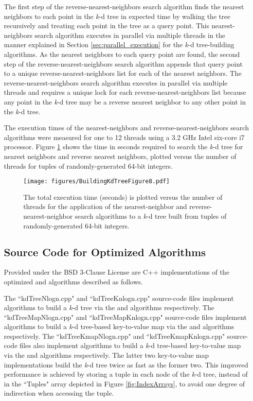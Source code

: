 \documentclass{sig-alternate}
\begin{document}
The first step of the reverse-nearest-neighbors search algorithm finds the  nearest neighbors to each point in the \emph{k}-d tree in  expected time by walking the tree recursively and treating each point in the tree as a query point. This nearest-neighbors search algorithm executes in parallel via multiple threads in the manner explained in Section \ref{sec:parallel_execution} for the \emph{k}-d tree-building algorithms. As the  nearest neighbors to each query point are found, the second step of the reverse-nearest-neighbors search algorithm appends that query point to a unique reverse-nearest-neighbors list for each of the  nearest neighbors. The reverse-nearest-neighbors search algorithm executes in parallel via multiple threads and requires a unique lock for each reverse-nearest-neighbors list because any point in the \emph{k}-d tree may be a reverse nearest neighbor to any other point in the \emph{k}-d tree.

The execution times of the nearest-neighbors and reverse-nearest-neighbors search algorithms were measured for one to 12 threads using a 3.2 GHz Intel six-core i7 processor.  Figure \ref{fig:Neighbors} shows the time in seconds required to search the \emph{k}-d tree for nearest neighbors and reverse nearest neighbors, plotted versus the number of threads  for   tuples of randomly-generated 64-bit integers.

\begin{figure}[h]
\centering
\centerline{\texttt{[image: figures/BuildingKdTreeFigure8.pdf]}}
\caption{The total execution time (seconds) is plotted versus the number of threads for the application of the nearest-neighbor and reverse-nearest-neighbor search algorithms to a \emph{k}-d tree built from   tuples of randomly-generated 64-bit integers.}
\label{fig:Neighbors}
\end{figure}

\subsection{Source Code for Optimized Algorithms}
\label{sec:source_code}

Provided under the BSD 3-Clause License are C++ implementations of the optimized  and  algorithms described as follows.

The ``kdTreeNlogn.cpp" and ``kdTreeKnlogn.cpp" source-code files implement algorithms to build a \emph{k}-d tree via the  and  algorithms respectively. The ``kdTreeMapNlogn.cpp" and ``kdTreeMapKnlogn.cpp" source-code files implement algorithms to build a \emph{k}-d tree-based key-to-value map via the  and  algorithms respectively. The ``kdTreeKmapNlogn.cpp" and ``kdTreeKmapKnlogn.cpp" source-code files also implement algorithms to build a \emph{k}-d tree-based key-to-value map via the  and  algorithms respectively. The latter two key-to-value map implementations build the \emph{k}-d tree twice as fast as the former two. This improved performance is achieved by storing a tuple in each node of the \emph{k}-d tree, instead of in the ``Tuples" array depicted in Figure \ref{fig:IndexArrays}, to avoid one degree of indirection when accessing the tuple.
\end{document}
